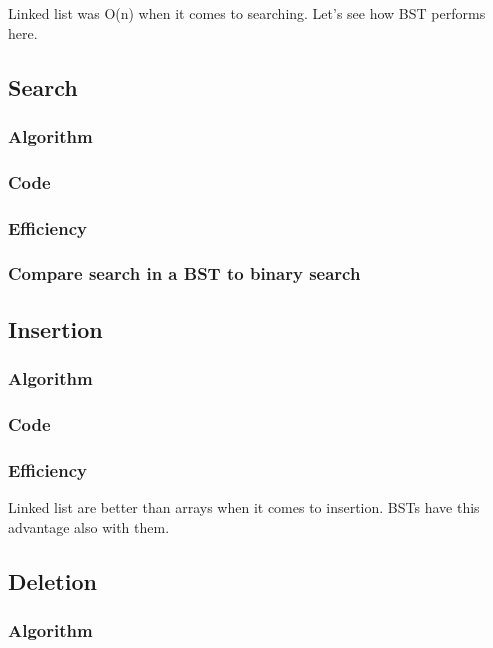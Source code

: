 \documentclass[12pt,a4paper]{article}
\begin{document}
Linked list was O(n) when it comes to searching. Let’s see how BST performs here.


\subsection{Search}

\subsubsection{Algorithm}

\subsubsection{Code}

\subsubsection{Efficiency}

\subsubsection{Compare search in a BST to binary search}

\subsection{Insertion}

\subsubsection{Algorithm}

\subsubsection{Code}

\subsubsection{Efficiency}

Linked list are better than arrays when it comes to insertion. BSTs have this advantage also with them. 

\subsection{Deletion}

\subsubsection{Algorithm}
\end{document}
